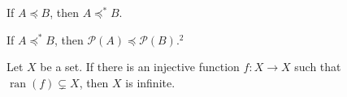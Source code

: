 \documentclass{ctexart}
\begin{document}
\begin{problem}
If $A \preccurlyeq B$, then $A \preccurlyeq^* B$.
\end{problem}

\begin{problem}
If $A \preccurlyeq^* B$, then $\mathscr{P}(A) \preccurlyeq \mathscr{P}(B) .^2$
\end{problem}

\begin{problem}
Let $X$ be a set. If there is an injective function $f: X \rightarrow X$ such that $\operatorname{ran}(f) \subsetneq X$, then $X$ is infinite.
\end{problem}
\end{document}
